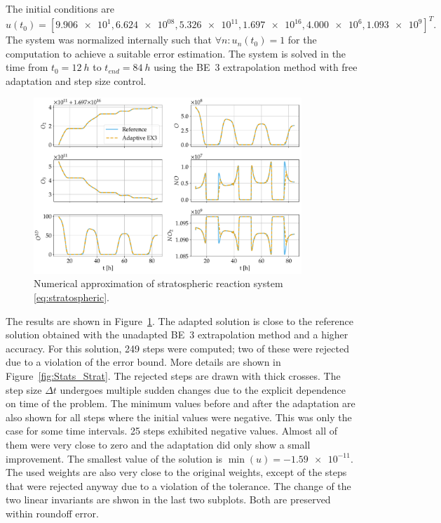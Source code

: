 \documentclass[a4paper]{article}
\numberwithin{equation}{section}
\theoremstyle{plain}
\theoremstyle{definition}
\numberwithin{theorem}{section}
\newcommand{\dt}{{\Delta t}}
\newcommand{\1}{\mathbbm{1}}
\begin{document}
The initial conditions are
\begin{equation}
  u(t_0) = [
    \num{9.906e+1},
    \num{6.624e08},
    \num{5.326e11},
    \num{1.697e16},
    \num{4.000e6},
    \num{1.093e9}
  ]^T.
\end{equation}
The system was normalized internally such that $\forall n\colon u_n(t_0) = 1$
for the computation to achieve a suitable error estimation.
The system is solved in the time from $t_{0} = \SI{12}{h}$ to $t_{end} = \SI{84}{h}$
using the BE~3 extrapolation method with free adaptation and step size
control.

\begin{figure}
\centering
\includegraphics[width=0.9\textwidth]{plots/Stratospheric_time.pdf}
\caption{Numerical approximation of stratospheric reaction system
         \eqref{eq:stratospheric}.}
\label{fig:Stratospheric_time}
\end{figure}

The results are shown in Figure~\ref{fig:Stratospheric_time}.
The adapted solution is close to the reference solution obtained
with the unadapted BE~3 extrapolation method and a higher accuracy.
For this solution, 249 steps were computed; two of these were rejected due to
a violation of the error bound.
More details are shown in Figure~\ref{fig:Stats_Strat}. The rejected steps are drawn with thick crosses.
The step size $\dt$ undergoes multiple sudden changes due to the explicit dependence
on time of the problem.
The minimum values before and after the adaptation are also shown for all steps where the initial values were negative.
This was only the case for some time intervals. 25 steps exhibited negative values.
Almost all of them were very close to zero and the adaptation did only show a small improvement.
The smallest value of the solution is $\min(u) = \num{-1.59e-11}$.
The used weights are also very close to the original weights, except of the steps that were rejected anyway due to a violation of the tolerance.
The change of the two linear invariants are shwon in the last two subplots. Both are preserved within roundoff error.
\end{document}
